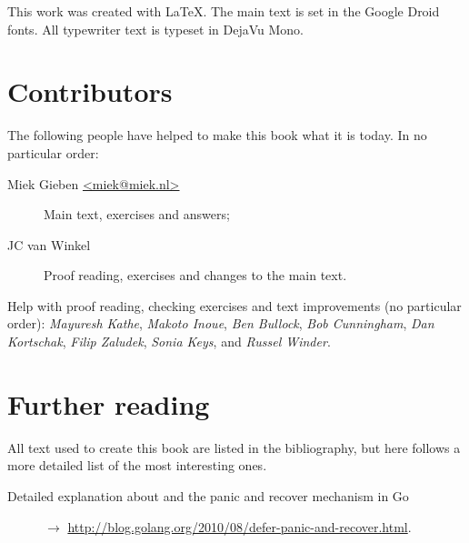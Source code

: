 \noindent{}This work was created with \LaTeX. The main text is set in
the Google Droid fonts. All typewriter text is typeset in DejaVu Mono.

\section{Contributors}
The following people have helped to make this book what it is today.
In no particular order:
\begin{description}
\item[Miek Gieben \qquad\url{<miek@miek.nl>}] 
{Main text, exercises and answers;}
\item[JC van Winkel]
{Proof reading, exercises and changes to the main text.}
\end{description}

Help with proof reading, checking exercises and text improvements (no
particular order):
\emph{Mayuresh Kathe},
\emph{Makoto Inoue},
\emph{Ben Bullock},
\emph{Bob Cunningham},
\emph{Dan Kortschak},
\emph{Filip Zaludek},
\emph{Sonia Keys},
and \emph{Russel Winder}.

\section{Further reading}
All text used to create this book are listed in the bibliography, but
here follows a more detailed list of the most interesting ones.
\begin{description}
\item[Detailed explanation about  and the panic and recover
mechanism in Go]{$\rightarrow$
\url{http://blog.golang.org/2010/08/defer-panic-and-recover.html}.}
\end{description}

